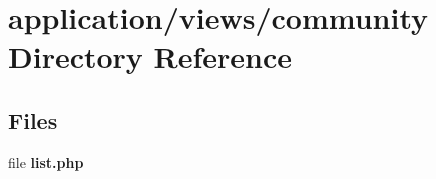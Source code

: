 \section{application/views/community Directory Reference}
\label{dir_cfd98c5c6eeaac3152fa57e9c2b2039c}
\subsection*{Files}
\begin{DoxyCompactItemize}
\item 
file {\bf list.\-php}
\end{DoxyCompactItemize}

